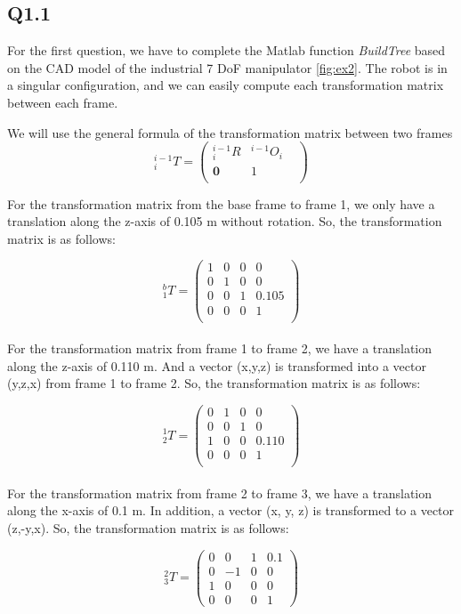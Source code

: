 \subsection{Q1.1}

For the first question, we have to complete the Matlab function \textit{BuildTree}  based on the CAD model of the industrial 7 DoF manipulator \ref{fig:ex2}. The robot is in a singular configuration, and we can easily compute each transformation matrix between each frame. 

We will use the general formula of the transformation matrix between two frames
\[
^{i-1}_i T = \begin{pmatrix}
        ^{i-1}_i R & ^{i-1}O_i & \\
        \textbf{0} & 1 & \\
        \end{pmatrix}
\]

For the transformation matrix from the base frame to frame 1, we only have a translation along the z-axis of 0.105 m without rotation. So, the transformation matrix is as follows:

\[^b_1 T = \begin{pmatrix}
        1 & 0 & 0 & 0 \\
        0 & 1 & 0 & 0 \\
        0 & 0 & 1 & 0.105 \\
        0 & 0 & 0 & 1 \\
    \end{pmatrix}\]
\\
For the transformation matrix from frame 1 to frame 2, we have a translation along the z-axis of 0.110 m. And a vector (x,y,z) is transformed into a vector (y,z,x) from frame 1 to frame 2. So, the transformation matrix is as follows:

\[^1_2 T = \begin{pmatrix}
        0 & 1 & 0 & 0 \\
        0 & 0 & 1 & 0 \\
        1 & 0 & 0 & 0.110 \\
        0 & 0 & 0 & 1 \\
    \end{pmatrix}\]
\\
For the transformation matrix from frame 2 to frame 3, we have a translation along the x-axis of 0.1 m. In addition, a vector (x, y, z) is transformed to a vector (z,-y,x). So, the transformation matrix is as follows:

\[^2_3 T = \begin{pmatrix}
        0 & 0 & 1 & 0.1 \\
        0 & -1 & 0 & 0 \\
        1 & 0 & 0 & 0 \\
        0 & 0 & 0 & 1 
    \end{pmatrix}\]

